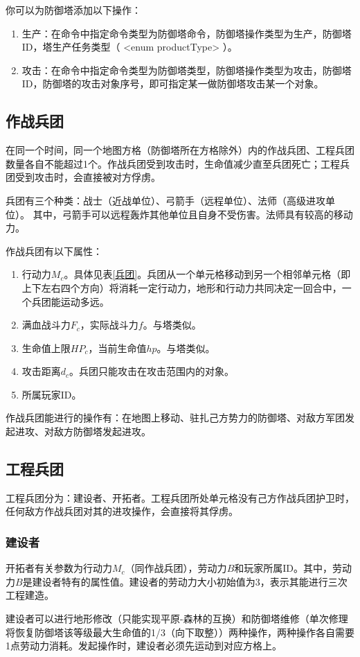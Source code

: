 \documentclass[a4paper,4pt]{article}
\begin{document}
你可以为防御塔添加以下操作：
\begin{enumerate}[fullwidth, itemindent=2em, label=(\arabic*)]
  \item 生产：在命令中指定命令类型为防御塔命令，防御塔操作类型为生产，防御塔ID，塔生产任务类型（ <enum  productType> ）。
  \item 攻击：在命令中指定命令类型为防御塔类型，防御塔操作类型为攻击，防御塔ID，防御塔的攻击对象序号，即可指定某一做防御塔攻击某一个对象。
\end{enumerate}

\subsection{作战兵团}
在同一个时间，同一个地图方格（防御塔所在方格除外）内的作战兵团、工程兵团数量各自不能超过1个。作战兵团受到攻击时，生命值减少直至兵团死亡；工程兵团受到攻击时，会直接被对方俘虏。\par
兵团有三个种类：战士（近战单位）、弓箭手（远程单位）、法师（高级进攻单位）。
其中，弓箭手可以远程轰炸其他单位且自身不受伤害。法师具有较高的移动力。\par
作战兵团有以下属性：
\begin{enumerate}[fullwidth, itemindent=2em, label=(\arabic*)]
  \item 行动力$M_c$。具体见表\ref{兵团}。兵团从一个单元格移动到另一个相邻单元格（即上下左右四个方向）将消耗一定行动力，地形和行动力共同决定一回合中，一个兵团能运动多远。
  \item 满血战斗力$F_c$，实际战斗力$f$。与塔类似。
  \item 生命值上限$HP_c$，当前生命值$hp$。与塔类似。
  \item 攻击距离$d_c$。兵团只能攻击在攻击范围内的对象。
  \item 所属玩家ID。
\end{enumerate}
作战兵团能进行的操作有：在地图上移动、驻扎己方势力的防御塔、对敌方军团发起进攻、对敌方防御塔发起进攻。


\subsection{工程兵团}
工程兵团分为：建设者、开拓者。工程兵团所处单元格没有己方作战兵团护卫时，任何敌方作战兵团对其的进攻操作，会直接将其俘虏。\par

\subsubsection{建设者}
开拓者有关参数为行动力$M_c$（同作战兵团），劳动力$B$和玩家所属ID。其中，劳动力$B$是建设者特有的属性值。建设者的劳动力大小初始值为3，表示其能进行三次工程建造。\par %
建设者可以进行地形修改（只能实现平原-森林的互换）和防御塔维修（单次修理将恢复防御塔该等级最大生命值的1/3（向下取整））两种操作，两种操作各自需要1点劳动力消耗。发起操作时，建设者必须先运动到对应方格上。
\end{document}
